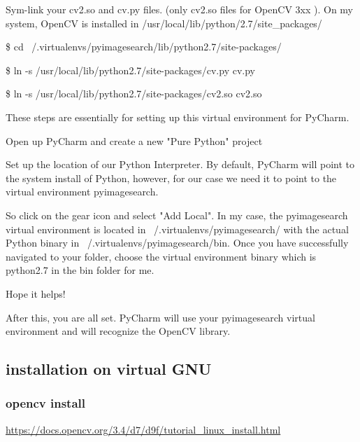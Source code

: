 \documentclass{scrartcl}
\begin{document}
Sym-link your cv2.so and cv.py files. (only cv2.so files for OpenCV 3xx ). On my system, OpenCV is installed in /usr/local/lib/python/2.7/site\_packages/



\$  cd ~/.virtualenvs/pyimagesearch/lib/python2.7/site-packages/



\$  ln -s /usr/local/lib/python2.7/site-packages/cv.py cv.py



\$  ln -s /usr/local/lib/python2.7/site-packages/cv2.so cv2.so

These steps are essentially for setting up this virtual environment for PyCharm.

Open up PyCharm and create a new "Pure Python" project



Set up the location of our Python Interpreter. By default, PyCharm will point to the system install of Python, however, for our case we need it to point to the virtual environment pyimagesearch.



So click on the gear icon and select "Add Local". In my case, the pyimagesearch  virtual environment is located in  ~/.virtualenvs/pyimagesearch/ with the actual Python binary in  ~/.virtualenvs/pyimagesearch/bin. Once you have successfully navigated to your folder, choose the virtual environment binary which is python2.7 in the bin folder for me.



Hope it helps!



After this, you are all set. PyCharm will use your pyimagesearch virtual environment and will recognize the OpenCV library.



\subsection{installation on virtual GNU}



\subsubsection{opencv install}

\href{https://docs.opencv.org/3.4/d7/d9f/tutorial_linux_install.html}{https://docs.opencv.org/3.4/d7/d9f/tutorial\_linux\_install.html}
\end{document}
